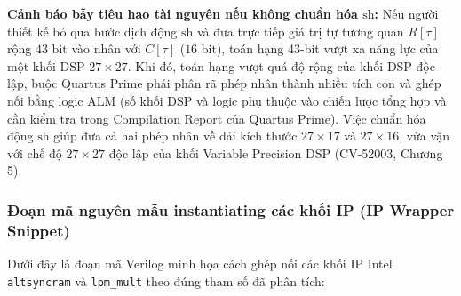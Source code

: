 \begin{costbox}
\textbf{Cảnh báo bẫy tiêu hao tài nguyên nếu không chuẩn hóa $\text{sh}$:}
Nếu người thiết kế bỏ qua bước dịch động $\text{sh}$ và đưa trực tiếp giá trị tự tương quan $R[\tau]$ rộng $43\text{ bit}$ vào nhân với $C[\tau]$ ($16\text{ bit}$), toán hạng 43-bit vượt xa năng lực của một khối DSP $27 \times 27$. 
Khi đó, toán hạng vượt quá độ rộng của khối DSP độc lập, buộc Quartus Prime phải phân rã phép nhân thành nhiều tích con và ghép nối bằng logic ALM (số khối DSP và logic phụ thuộc vào chiến lược tổng hợp và cần kiểm tra trong Compilation Report của Quartus Prime). Việc chuẩn hóa động $\text{sh}$ giúp đưa cả hai phép nhân về dải kích thước $27 \times 17$ và $27 \times 16$, vừa vặn với chế độ $27 \times 27$ độc lập của khối Variable Precision DSP (CV-52003, Chương 5).
\end{costbox}

\subsubsection*{Đoạn mã nguyên mẫu instantiating các khối IP (IP Wrapper Snippet)}
Dưới đây là đoạn mã Verilog minh họa cách ghép nối các khối IP Intel \texttt{altsyncram} và \texttt{lpm\_mult} theo đúng tham số đã phân tích:

